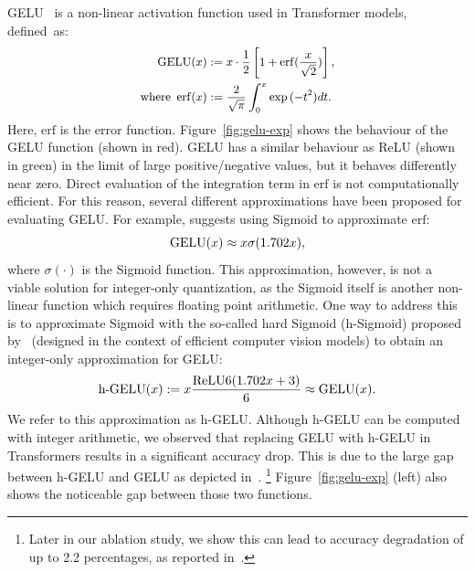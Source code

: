 GELU~\cite{hendrycks2016gaussian} is a non-linear activation function used in Transformer models, defined~as:
\begin{equation}
\small
\begin{split}
\label{eq:gelu}
    \mathrm{GELU}(x) &:= x \cdot \frac12 \left[ 1 + \mathrm{erf}(\frac{x}{\sqrt{2}})\right], \\
    \text{where} \enspace \mathrm{erf}(x) &:= \frac{2}{\sqrt{\pi}}\int_0^x \exp{(-t^2)} dt.
\end{split}
\end{equation}
Here, $\mathrm{erf}$ is the error function. Figure~\ref{fig:gelu-exp} shows the behaviour of the GELU function (shown in red).
GELU has a similar behaviour as ReLU (shown in green) in the limit of large positive/negative values,
but it behaves differently near zero.
Direct evaluation of the integration term in $\mathrm{erf}$ is not computationally efficient.
For this reason, several different approximations have been
proposed for evaluating GELU. For example, \cite{hendrycks2016gaussian} suggests using
Sigmoid to approximate $\mathrm{erf}$:
\begin{equation}
\label{eqn:gelu-approx}
\small
\mathrm{GELU}(x) \approx x \sigma(1.702 x),
\end{equation}
where $\sigma(\cdot)$ is the Sigmoid function.
This approximation, however, is not a viable solution for integer-only quantization, as the Sigmoid itself is another non-linear function which requires
floating point arithmetic.
One way to address this is to approximate Sigmoid with the so-called
hard Sigmoid (h-Sigmoid) proposed by~\cite{howard2019searching} (designed in the context of efficient computer vision models) to obtain an integer-only approximation for GELU:
\begin{equation}
\small
\label{eqn:hgelu}
\mathrm{h{\text-}GELU}(x) := x\frac{\mathrm{ReLU6}(1.702x+3)}{6} \approx \mathrm{GELU}(x).
\end{equation} 
We refer to this approximation as h-GELU.
Although h-GELU can be computed with integer arithmetic, we observed that replacing GELU with h-GELU in Transformers results in a significant accuracy drop.
This is due to the large gap between h-GELU and GELU as depicted in~.%
\footnote{Later in our ablation study, we show this can lead to accuracy degradation of up to 2.2 percentages, as reported in~.}
Figure~\ref{fig:gelu-exp} (left) also shows the noticeable gap between those two functions. 


